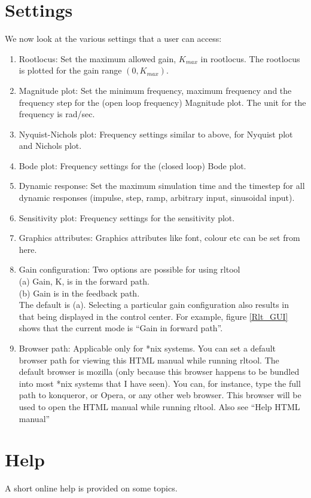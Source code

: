\section{Settings}
\label{settings}
We now look at the various settings that a user can access:
\begin{enumerate}
\item Rootlocus: Set the maximum allowed gain, $K_{max}$ in rootlocus. The
rootlocus is plotted for the gain range $(0,K_{max})$.
\item Magnitude plot: Set the minimum frequency, maximum frequency and
the frequency step for the (open loop frequency) Magnitude plot. The unit for
the frequency is rad/sec. 
\item Nyquist-Nichols plot: Frequency settings similar to above, for
Nyquist plot and Nichols plot.
\item Bode plot: Frequency settings for the (closed loop) Bode plot.
\item Dynamic response: Set the maximum simulation time and the
timestep for all dynamic responses (impulse, step, ramp, arbitrary
input, sinusoidal input).
\item Sensitivity plot: Frequency settings for the sensitivity plot.
\item Graphics attributes: Graphics attributes like font, colour etc
can be set from here. 
\item Gain configuration: Two options are possible for using rltool\\
(a) Gain, K, is in the forward path. \\
(b) Gain is in the feedback path. \\
The default is (a).
Selecting a particular gain configuration also results in that being
displayed in the control center. For example, figure \ref{Rlt_GUI}
shows that the current mode is ``Gain in forward path''. 
\item Browser path: Applicable only for *nix systems. You can set a
  default browser path for viewing this HTML manual while running
  rltool. The default browser is mozilla (only because this browser
  happens to be bundled into most *nix systems that I have seen). You
  can, for instance, type the full path to konqueror, or Opera, or any
  other web browser. This browser will be used to open the HTML manual
  while running rltool. Also see ``Help \rar HTML manual'' 
\end{enumerate}
\section{Help}
A short online help is provided on some topics. 

  

